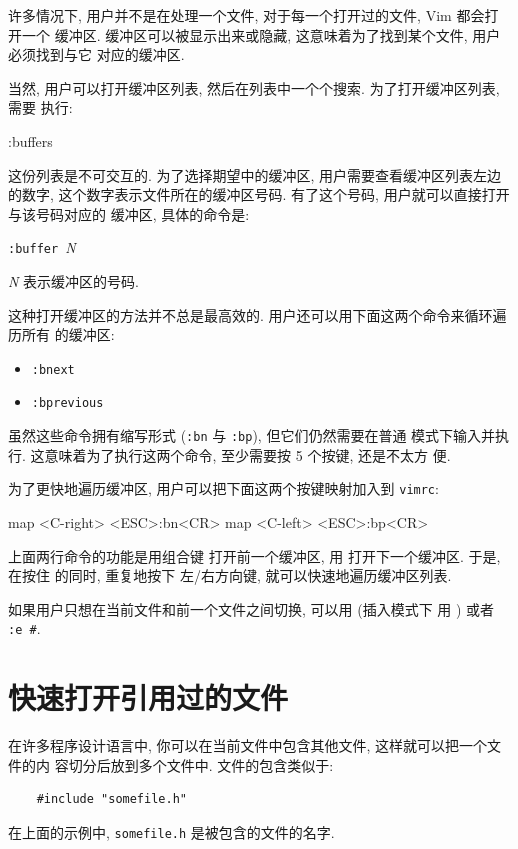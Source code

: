 许多情况下, 用户并不是在处理一个文件, 对于每一个打开过的文件, Vim 都会打开一个
缓冲区. 缓冲区可以被显示出来或隐藏, 这意味着为了找到某个文件, 用户必须找到与它
对应的缓冲区.

当然, 用户可以打开缓冲区列表, 然后在列表中一个个搜索. 为了打开缓冲区列表, 需要
执行:
\begin{vimcode}
:buffers
\end{vimcode}

这份列表是不可交互的. 为了选择期望中的缓冲区, 用户需要查看缓冲区列表左边的数字,
这个数字表示文件所在的缓冲区号码. 有了这个号码, 用户就可以直接打开与该号码对应的
缓冲区, 具体的命令是:
\begin{vimcmdform}
\texttt{:buffer }\textit{N}
\end{vimcmdform}
\textit{N} 表示缓冲区的号码.

这种打开缓冲区的方法并不总是最高效的. 用户还可以用下面这两个命令来循环遍历所有
的缓冲区:
\begin{itemize}
    \item \texttt{:bnext}
    \item \texttt{:bprevious}
\end{itemize}

虽然这些命令拥有缩写形式 (\texttt{:bn} 与 \texttt{:bp}), 但它们仍然需要在普通
模式下输入并执行. 这意味着为了执行这两个命令, 至少需要按 5 个按键, 还是不太方
便.

为了更快地遍历缓冲区, 用户可以把下面这两个按键映射加入到 \texttt{vimrc}:
\begin{vimcode}
map <C-right> <ESC>:bn<CR>
map <C-left> <ESC>:bp<CR>
\end{vimcode}
上面两行命令的功能是用组合键  打开前一个缓冲区, 用
 打开下一个缓冲区. 于是, 在按住  的同时, 重复地按下
左/右方向键, 就可以快速地遍历缓冲区列表.

\begin{warning}
    如果用户只想在当前文件和前一个文件之间切换, 可以用  (插入模式下
    用  ) 或者 \texttt{:e \#}.
\end{warning}

\section{快速打开引用过的文件}
\label{sec:open_referenced_files_faster}

在许多程序设计语言中, 你可以在当前文件中包含其他文件, 这样就可以把一个文件的内
容切分后放到多个文件中. 文件的包含类似于:
\begin{verbatim}
    #include "somefile.h"
\end{verbatim}
在上面的示例中, \texttt{somefile.h} 是被包含的文件的名字.

